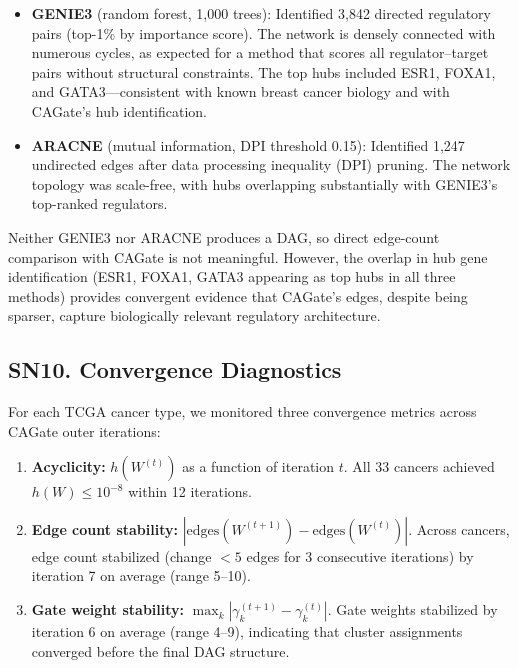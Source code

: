 \documentclass[11pt,a4paper]{article}
\begin{document}
\begin{itemize}[leftmargin=*,itemsep=2pt]
    \item \textbf{GENIE3} (random forest, 1,000 trees): Identified 3,842 directed regulatory pairs (top-1\% by importance score). The network is densely connected with numerous cycles, as expected for a method that scores all regulator--target pairs without structural constraints. The top hubs included ESR1, FOXA1, and GATA3---consistent with known breast cancer biology and with CAGate's hub identification.
    
    \item \textbf{ARACNE} (mutual information, DPI threshold 0.15): Identified 1,247 undirected edges after data processing inequality (DPI) pruning. The network topology was scale-free, with hubs overlapping substantially with GENIE3's top-ranked regulators.
\end{itemize}

Neither GENIE3 nor ARACNE produces a DAG, so direct edge-count comparison with CAGate is not meaningful. However, the overlap in hub gene identification (ESR1, FOXA1, GATA3 appearing as top hubs in all three methods) provides convergent evidence that CAGate's edges, despite being sparser, capture biologically relevant regulatory architecture.

\subsection*{SN10. Convergence Diagnostics}

For each TCGA cancer type, we monitored three convergence metrics across CAGate outer iterations:

\begin{enumerate}[leftmargin=*,itemsep=2pt]
    \item \textbf{Acyclicity:} $h(W^{(t)})$ as a function of iteration $t$. All 33 cancers achieved $h(W) \leq 10^{-8}$ within 12 iterations.
    \item \textbf{Edge count stability:} $|\text{edges}(W^{(t+1)}) - \text{edges}(W^{(t)})|$. Across cancers, edge count stabilized (change $< 5$ edges for 3 consecutive iterations) by iteration 7 on average (range 5--10).
    \item \textbf{Gate weight stability:} $\max_k |\gamma_k^{(t+1)} - \gamma_k^{(t)}|$. Gate weights stabilized by iteration 6 on average (range 4--9), indicating that cluster assignments converged before the final DAG structure.
\end{enumerate}
\end{document}
